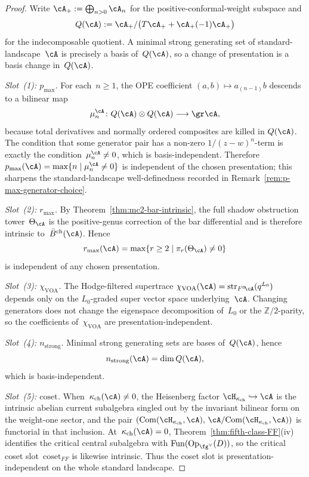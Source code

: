 \begin{proof}
Write
$\cA_+ := \bigoplus_{n>0}\cA_n$
for the positive-conformal-weight subspace and
\[
Q(\cA)
:=
\cA_+/\bigl(T\cA_+ + \cA_+(-1)\cA_+\bigr)
\]
for the indecomposable quotient. A minimal strong generating set of
standard-landscape~$\cA$ is precisely a basis of~$Q(\cA)$, so a change
of presentation is a basis change in~$Q(\cA)$.

\emph{Slot~(1): \(p_{\max}\).}
For each~$n\geq 1$, the OPE coefficient
$(a,b)\mapsto a_{(n-1)}b$ descends to a bilinear map
\[
\mu_n^\cA\colon Q(\cA)\otimes Q(\cA)\longrightarrow \gr\cA,
\]
because total derivatives and normally ordered composites are killed in
$Q(\cA)$. The condition that some generator pair has a non-zero
$1/(z-w)^n$-term is exactly the condition~$\mu_n^\cA\neq 0$, which is
basis-independent. Therefore
$p_{\max}(\cA)=\max\{n\mid \mu_n^\cA\neq 0\}$ is independent of the
chosen presentation; this sharpens the standard-landscape
well-definedness recorded in
Remark~\ref{rem:p-max-generator-choice}.

\emph{Slot~(2): \(r_{\max}\).}
By Theorem~\ref{thm:mc2-bar-intrinsic}, the full shadow obstruction
tower~$\Theta_\cA$ is the positive-genus correction of the bar
differential and is therefore intrinsic to~$\bar{B}^{\mathrm{ch}}(\cA)$.
Hence
\[
r_{\max}(\cA)=\max\{r\geq 2\mid \pi_r(\Theta_\cA)\neq 0\}
\]
is independent of any chosen presentation.

\emph{Slot~(3): \(\chi_{\mathrm{VOA}}\).}
The Hodge-filtered supertrace
$\chi_{\mathrm{VOA}}(\cA)=\operatorname{str}_{F^0\!\cA}(q^{L_0})$
depends only on the
$L_0$-graded super vector space underlying~$\cA$. Changing generators
does not change the eigenspace decomposition of~$L_0$ or the
$\mathbb{Z}/2$-parity, so the coefficients of~$\chi_{\mathrm{VOA}}$ are
presentation-independent.

\emph{Slot~(4): \(n_{\mathrm{strong}}\).}
Minimal strong generating sets are bases of~$Q(\cA)$, hence
\[
n_{\mathrm{strong}}(\cA)=\dim Q(\cA),
\]
which is basis-independent.

\emph{Slot~(5): \(\mathrm{coset}\).}
When~$\kappa_{\mathrm{ch}}(\cA)\neq 0$, the Heisenberg factor
$\cH_{\kappa_{\mathrm{ch}}}\hookrightarrow \cA$ is the intrinsic abelian
current subalgebra singled out by the invariant bilinear form on the
weight-one sector, and the pair
$(\mathrm{Com}(\cH_{\kappa_{\mathrm{ch}}},\cA),\,
\cA/\mathrm{Com}(\cH_{\kappa_{\mathrm{ch}}},\cA))$
is functorial in that inclusion. At~$\kappa_{\mathrm{ch}}(\cA)=0$,
Theorem~\ref{thm:fifth-class-FF}(iv) identifies the critical central
subalgebra with
$\operatorname{Fun}(\mathrm{Op}_{\fg^\vee}(D))$, so the critical coset
slot~$\mathrm{coset}_{FF}$ is likewise intrinsic. Thus the coset slot is
presentation-independent on the whole standard landscape.
\end{proof}

